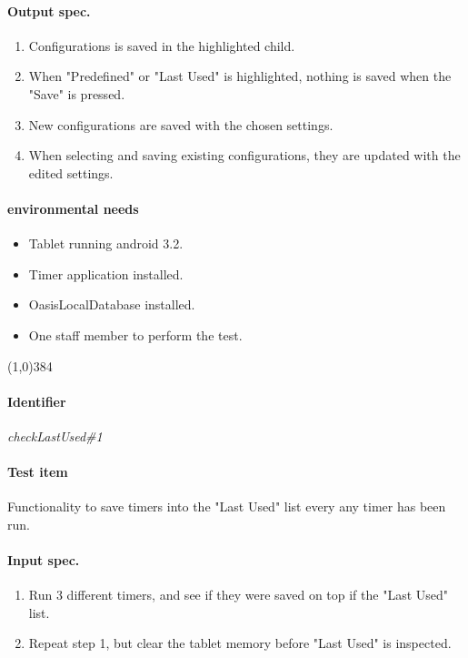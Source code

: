 \paragraph{Output spec.}
	\begin{enumerate}
		\item Configurations is saved in the highlighted child.
		\item When "Predefined" or "Last Used" is highlighted, nothing is saved when the "Save" is pressed.
		\item New configurations are saved with the chosen settings.
		\item When selecting and saving existing configurations, they are updated with the edited settings.
	\end{enumerate}
\paragraph{environmental needs}
	\begin{itemize}
		\item Tablet running android 3.2.
		\item Timer application installed.
		\item OasisLocalDatabase installed.
		\item One staff member to perform the test.
	\end{itemize}
\begin{center}
	\line(1,0){384}
\end{center}

\pagebreak
\paragraph{Identifier}
	\textit{checkLastUsed\#1}
\paragraph{Test item}
	Functionality to save timers into the "Last Used" list every any timer has been run.
\paragraph{Input spec.}
	\begin{enumerate}
		\item Run 3 different timers, and see if they were saved on top if the "Last Used" list.
		\item Repeat step 1, but clear the tablet memory before "Last Used" is inspected.
	\end{enumerate}
